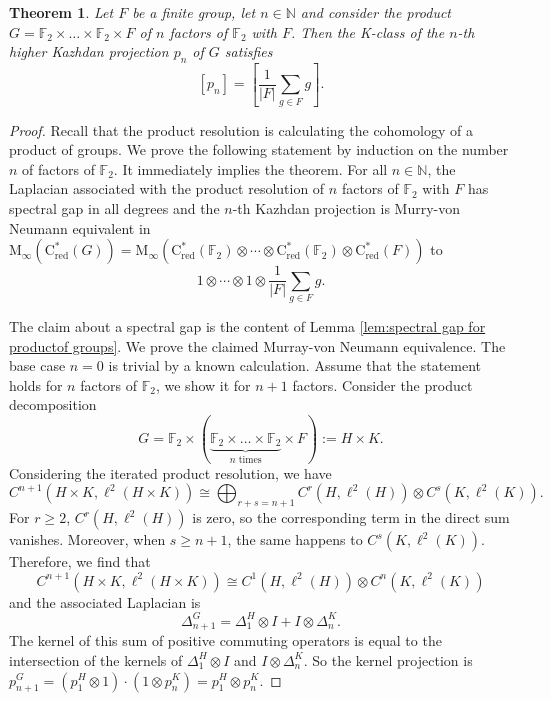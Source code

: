 \documentclass[a4paper,leqno,12pt]{article}
\numberwithin{equation}{section}
\theoremstyle{plain}
\newtheorem{theorem}[theoremcounter]{Theorem}
\theoremstyle{definition}
\theoremstyle{remark}
\newcommand{\Csr}{\mathrm{C}^*_{\text{red}}}
\begin{document}
	\begin{theorem} \label{thm:higher Kazh proj product group}
		Let $F$ be a finite group, let $n \in \mathbb N$ and consider the product
		$G = \mathbb F_2 \times \dotsc \times \mathbb F_2 \times F$ of $n$ factors of $\mathbb F_2$ with $F$. Then the K-class of the $n$-th higher Kazhdan projection $p_n$ of $G$ satisfies		
		\[
			[p_n] = \left[\frac{1}{|F|}{\sum_{g\in F}{g}}\right].
		\]
	\end{theorem}
	
	\begin{proof}
		Recall that the product resolution is calculating the cohomology of a product of groups. We prove the following statement by induction on the number $n$ of factors of $\mathbb F_2$. It immediately implies the theorem. For all $n\in \mathbb N$, the Laplacian associated with the product resolution of $n$ factors of $\mathbb{F}_2$ with $F$ has spectral gap in all degrees and the $n$-th Kazhdan projection is Murry-von Neumann equivalent in $\mathrm M_{\infty}(\Csr(G)) = \mathrm {M_{\infty}}(\Csr(\mathbb F_2) \otimes  \cdots \otimes \Csr(\mathbb F_2) \otimes \Csr(F))$ to 
		\[
			1\otimes \cdots \otimes 1\otimes \frac{1}{|F|}{\sum_{g\in F}{g}}.
		\]
		
		The claim about a spectral gap is the content of Lemma \ref{lem:spectral gap for productof groups}. We prove the claimed Murray-von Neumann equivalence.  The base case $n=0$ is trivial by a known calculation. Assume that the statement holds for $n$ factors of $\mathbb F_2$, we show it for $n+1$ factors. 
		Consider the product decomposition 
		\[
			G = \mathbb F_2 \times (\underbrace{\mathbb F_2 \times \dotsc \times \mathbb F_2}_{n \text{ times}} \times F) := H \times K.
		\]
		Considering the iterated product resolution, we have
		\[
			 C^{n+1}(H \times K, \ell^2(H \times K)) \cong 
			\bigoplus_{r+s=n+1} C^r(H, \ell^2(H)) \otimes C^s(K, \ell^2(K)).	
		\]
		For $r\geq 2$, $C^r(H, \ell^2(H))$ is zero, so the corresponding term in the direct sum vanishes. Moreover, when $s \geq n + 1$, the same happens to $C^s(K, \ell^2(K))$. Therefore, we find that
		\[
		C^{n+1}(H \times K, \ell^2(H \times K)) \cong C^1(H, \ell^2(H)) \otimes C^n(K, \ell^2(K))	
		\]
		and the associated Laplacian is 
		\[
		\Delta^G_{n+1} = \Delta_1^H \otimes I + I \otimes \Delta_n^K
		.
		\]
		The kernel of this sum of positive commuting operators is equal to the intersection of the kernels of $\Delta_1^H \otimes I$ and $I \otimes \Delta_n^K$. So the kernel projection is $p_{n+1}^G = (p_1^{H} \otimes 1) \cdot (1 \otimes p_n^K) = p_1^{H} \otimes p_n^K$.
		

\end{proof}
\end{document}
